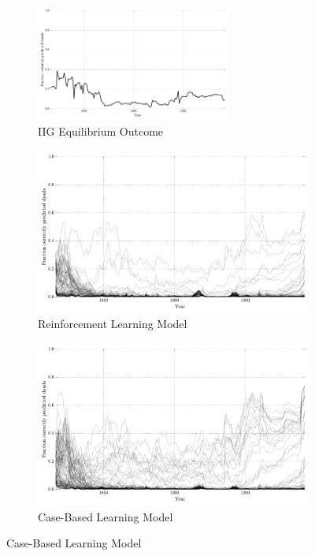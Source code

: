 \begin{landscape}

	\begin{figure}[h!]
	    \centering
		\begin{subfigure}[t]{\textwidth}
	        \includegraphics[width=0.7\textwidth]{WarReason/Figures/EQ_correct}
	        \caption{IIG Equilibrium Outcome}
	        \label{fig:eq_correct}
	    \end{subfigure}

	    \begin{subfigure}[t]{0.7\textwidth}
	        \includegraphics[width=\textwidth]{WarReason/Figures/RL_correct}
	        \caption{Reinforcement Learning Model}
	    \end{subfigure}
	    \begin{subfigure}[t]{0.7\textwidth}
	        \includegraphics[width=\textwidth]{WarReason/Figures/CB_correct}
	        \caption{Case-Based Learning Model}
	    \end{subfigure}


\end{figure}
\end{landscape}
